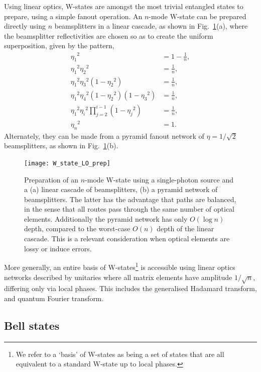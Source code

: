 Using linear optics, W-states are amongst the most trivial entangled states to prepare, using a simple fanout operation. An $n$-mode W-state can be prepared directly using $n$ beamsplitters in a linear cascade, as shown in Fig.~\ref{fig:W_state_LO_prep}(a), where the beamsplitter reflectivities are chosen so as to create the uniform superposition, given by the pattern,
\begin{align}
	{\eta_1}^2 &= 1 - \frac{1}{n},\nonumber\\
	{\eta_1}^2 {\eta_2}^2 &= \frac{1}{n},\nonumber\\
	{\eta_1}^2 {\eta_3}^2 (1-{\eta_2}^2)  &= \frac{1}{n},\nonumber\\
	{\eta_1}^2 {\eta_4}^2(1-{\eta_2}^2) (1-{\eta_3}^2)  &= \frac{1}{n},\nonumber\\
	{\eta_1}^2 {\eta_i}^2 \prod_{j=2}^{i-1} (1-{\eta_j}^2) &= \frac{1}{n},\nonumber\\
	{\eta_n}^2 &= 1.
\end{align}
Alternately, they can be made from a pyramid fanout network of \mbox{$\eta=1/\sqrt{2}$} beamsplitters, as shown in Fig.~\ref{fig:W_state_LO_prep}(b).

\begin{figure}[!htb]
\texttt{[image: W\_state\_LO\_prep]}
\caption{Preparation of an $n$-mode W-state using a single-photon source and a (a) linear cascade of beamsplitters, (b) a pyramid network of beamsplitters. The latter has the advantage that paths are balanced, in the sense that all routes pass through the same number of optical elements. Additionally the pyramid network has only \mbox{$O(\log n)$} depth, compared to the worst-case \mbox{$O(n)$} depth of the linear cascade. This is a relevant consideration when optical elements are lossy or induce errors.}\label{fig:W_state_LO_prep}	
\end{figure}

More generally, an entire basis of W-states\footnote{We refer to a `basis' of W-states as being a set of states that are all equivalent to a standard W-state up to local phases.} is accessible using linear optics networks described by unitaries where all matrix elements have amplitude $1/\sqrt{n}$, differing only via local phases. This includes the generalised Hadamard transform, and quantum Fourier transform.

%
%

\subsection{Bell states} \label{sec:bell_state_res} 

